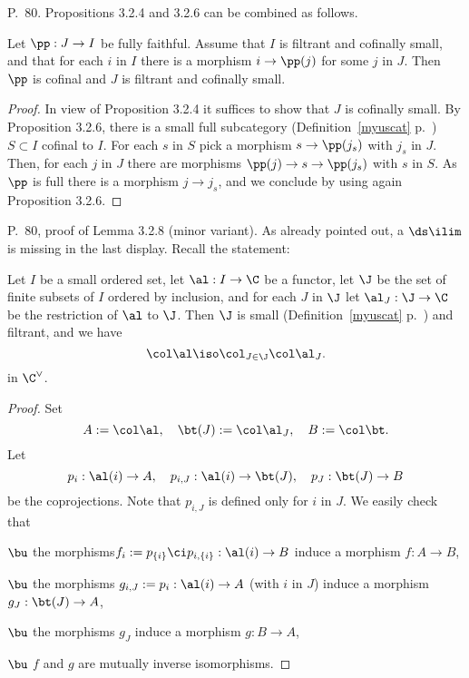 \documentclass[12pt]{article}
\theoremstyle{remark}
\theoremstyle{definition}
\begin{document}
\begin{s} 
P.~80. Propositions 3.2.4 and 3.2.6 can be combined as follows. 

\begin{prop}
Let $\pp:J\to I$ be fully faithful. Assume that $I$ is filtrant and cofinally small, and that for each $i$ in $I$ there is a morphism $i\to\pp(j)$ for some $j$ in $J$. Then $\pp$ is cofinal and $J$ is filtrant and cofinally small. 
\end{prop} 

\begin{proof}
In view of Proposition 3.2.4 it suffices to show that $J$ is cofinally small. By Proposition 3.2.6, there is a small full subcategory (Definition~\ref{myuscat} p.~) $S\subset I$ cofinal to $I$. For each $s$ in $S$ pick a morphism $s\to\pp(j_s)$ with $j_s$ in $J$. Then, for each $j$ in $J$ there are morphisms $\pp(j)\to s\to\pp(j_s)$ with $s$ in $S$. As $\pp$ is full there is a morphism $j\to j_s$, and we conclude by using again Proposition 3.2.6.
\end{proof}
\end{s}

%

\begin{s} 
P.~80, proof of Lemma 3.2.8 (minor variant). As already pointed out, a $\ds\ilim$ is missing in the last display. Recall the statement:
\begin{lem}
Let $I$ be a small ordered set, let $\al:I\to\C$ be a functor, let $\J$ be the set of finite subsets of $I$ ordered by inclusion, and for each $J$ in $\J$ let $\al_J:\J\to\C$ be the restriction of $\al$ to $\J$. Then $\J$ is small (Definition~\ref{myuscat} p.~) and filtrant, and we have
$$
\col\al\iso\col_{J\in\J}\col\al_J.
$$ 
in $\C^\vee$.
\end{lem}
\begin{proof}
Set
$$
A:=\col\al,\quad
\bt(J):=\col\al_J,\quad
B:=\col\bt.
$$
Let 
$$
p_i:\al(i)\to A,\quad 
p_{i,J}:\al(i)\to\bt(J),\quad 
p_J:\bt(J)\to B
$$
be the coprojections. Note that $p_{i,J}$ is defined only for $i$ in $J$. We easily check that 

\nn$\bu$ the morphisms$f_i:=p_{\{i\}}\ci p_{i,\{i\}}:\al(i)\to B$ induce a morphism $f:A\to B$, 

\nn$\bu$ the morphisms $g_{i,J}:=p_i:\al(i)\to A$ (with $i$ in $J$) induce a morphism $g_J:\bt(J)\to A$, 

\nn$\bu$ the morphisms $g_J$ induce a morphism $g:B\to A$, 

\nn$\bu$ $f$ and $g$ are mutually inverse isomorphisms.
\end{proof}
\end{s}
\end{document}
